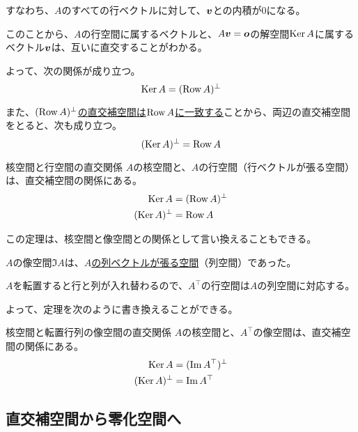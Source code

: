 \documentclass[../../../topic_linear-algebra]{subfiles}
\begin{document}
すなわち、$A$のすべての行ベクトルに対して、$\vb*{v}$との内積が0になる。

\br

このことから、$A$の行空間に属するベクトルと、$A\vb*{v} = \vb*{o}$の解空間$\operatorname{Ker} A$に属するベクトル$\vb*{v}$は、互いに直交することがわかる。

よって、次の関係が成り立つ。
\begin{equation*}
  \operatorname{Ker} A = (\operatorname{Row} A)^\perp
\end{equation*}

また、\hyperref[thm:double-orthogonal-complement]{$(\operatorname{Row} A)^\perp$の直交補空間は$\operatorname{Row} A$に一致する}ことから、両辺の直交補空間をとると、次も成り立つ。
\begin{equation*}
  (\operatorname{Ker} A)^\perp = \operatorname{Row} A
\end{equation*}

\begin{theorem}{核空間と行空間の直交関係}
  $A$の核空間と、$A$の行空間（行ベクトルが張る空間）は、直交補空間の関係にある。
  \begin{align*}
    \operatorname{Ker} A &= (\operatorname{Row} A)^\perp \\
    (\operatorname{Ker} A)^\perp &= \operatorname{Row} A
  \end{align*}
\end{theorem}

この定理は、核空間と像空間との関係として言い換えることもできる。

\br

$A$の像空間$\Im A$は、\hyperref[sec:image-and-column-space]{$A$の列ベクトルが張る空間}（列空間）であった。

$A$を転置すると行と列が入れ替わるので、$A^\top$の行空間は$A$の列空間に対応する。

\br

よって、定理を次のように書き換えることができる。

\begin{theorem}{核空間と転置行列の像空間の直交関係}
  $A$の核空間と、$A^\top$の像空間は、直交補空間の関係にある。
  \begin{align*}
    \operatorname{Ker} A &= (\Im A^\top)^\perp \\
    (\operatorname{Ker} A)^\perp &= \Im A^\top
  \end{align*}
\end{theorem}

\subsection{直交補空間から零化空間へ}
\end{document}
